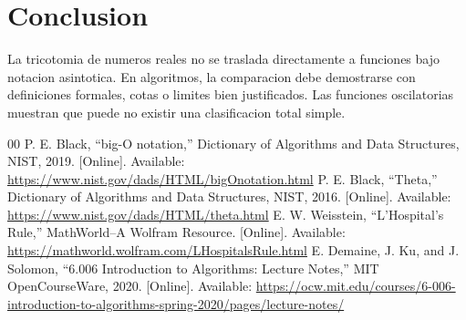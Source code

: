 \documentclass[conference]{IEEEtran}
\begin{document}
\section{Conclusion}
La tricotomia de numeros reales no se traslada directamente a funciones bajo
notacion asintotica. En algoritmos, la comparacion debe demostrarse con
definiciones formales, cotas o limites bien justificados. Las funciones
oscilatorias muestran que puede no existir una clasificacion total simple.

\begin{thebibliography}{00}
 P. E. Black, ``big-O notation,'' Dictionary of Algorithms and Data Structures, NIST, 2019. [Online]. Available: \url{https://www.nist.gov/dads/HTML/bigOnotation.html}
 P. E. Black, ``Theta,'' Dictionary of Algorithms and Data Structures, NIST, 2016. [Online]. Available: \url{https://www.nist.gov/dads/HTML/theta.html}
 E. W. Weisstein, ``L'Hospital's Rule,'' MathWorld--A Wolfram Resource. [Online]. Available: \url{https://mathworld.wolfram.com/LHospitalsRule.html}
 E. Demaine, J. Ku, and J. Solomon, ``6.006 Introduction to Algorithms: Lecture Notes,'' MIT OpenCourseWare, 2020. [Online]. Available: \url{https://ocw.mit.edu/courses/6-006-introduction-to-algorithms-spring-2020/pages/lecture-notes/}
\end{thebibliography}
\end{document}
